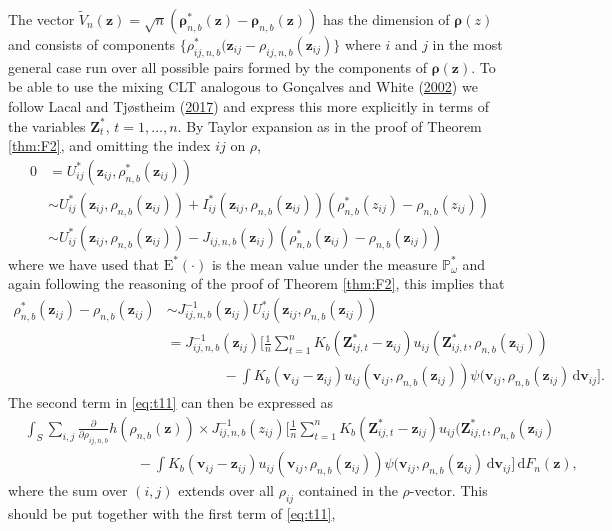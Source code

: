 \documentclass[
  12pt,
  letterpaper]{article}
\numberwithin{equation}{section}
\newcommand{\Z}{\bm{Z}}
\newcommand{\z}{\bm{z}}
\newcommand{\fv}{\bm{v}}
\newcommand{\frho}{\bm{\rho}}
\newcommand{\E}{\textrm{E}}
\newcommand{\di}{\,\textrm{d}}
\begin{document}
The vector \(\tilde{V}_n(\z) = \sqrt{n}\left(\frho_{n,b}^*(\z)-\frho_{n,b}(\z)\right)\) has the dimension of \(\frho(z)\) and consists of components \(\{\rho_{ij,n,b}^*(\z_{ij}-\rho_{ij,n,b}(\z_{ij})\}\) where \(i\) and \(j\) in the most general case run over all possible pairs formed by the components of \(\frho(\z)\). To be able to use the mixing CLT analogous to Gonçalves and White (\protect\hyperlink{ref-gonccalves2002bootstrap}{2002}) we follow Lacal and Tjøstheim (\protect\hyperlink{ref-lacal2017local}{2017}) and express this more explicitly in terms of the variables \(\Z^{*}_t\), \(t=1,\ldots,n\). By Taylor expansion as in the proof of Theorem \ref{thm:F2}, and omitting the index \(ij\) on \(\rho\),
\begin{align*}
0 &= U_{ij}^*(\z_{ij},\rho_{n,b}^*(\z_{ij})) \\
& \sim U_{ij}^*(\z_{ij},\rho_{n,b}(\z_{ij}))+I_{ij}^*(\z_{ij},\rho_{n,b}(\z_{ij}))(\rho_{n,b}^*(z_{ij})-\rho_{n,b}(z_{ij})) \\
& \sim U_{ij}^*(\z_{ij},\rho_{n,b}(\z_{ij})) - J_{ij,n,b}(\z_{ij})(\rho_{n,b}^*(\z_{ij})-\rho_{n,b}(\z_{ij}))
\end{align*}
where we have used that \(\E^*(\cdot)\) is the mean value under the measure \(\mathbb{P}_{\omega}^{*}\) and again following the reasoning of the proof of Theorem \ref{thm:F2}, this
implies that
\begin{align}
\rho_{n,b}^*(\z_{ij}) - \rho_{n,b}(\z_{ij}) &\sim J_{ij,n,b}^{-1}(\z_{ij})U^*_{ij}(\z_{ij},\rho_{n,b}(\z_{ij})) \nonumber \\
& = J_{ij,n,b}^{-1}(\z_{ij})\Big[\frac{1}{n}\sum_{t=1}^{n} K_b(\Z_{ij,t}^{*} - \z_{ij})u_{ij}(\Z_{ij,t}^{*},\rho_{n,b}(\z_{ij})) \nonumber \\
 & \qquad\qquad - \int K_b(\fv_{ij} - \z_{ij})u_{ij}(\fv_{ij},\rho_{n,b}(\z_{ij}))\psi(\fv_{ij},\rho_{n,b}(\z_{ij}) \di \fv_{ij}\big].
\end{align}
The second term in \eqref{eq:t11} can then be expressed as
\begin{align}
&\int_S \sum_{i,j} \frac{\partial}{\partial \rho_{ij,n,b}} h(\rho_{n,b}(\z)) \times
 J_{ij,n,b}^{-1}(z_{ij})
\Big[\frac{1}{n}\sum_{t=1}^{n} K_b(\Z_{ij,t}^{*}-\z_{ij})u_{ij}(\Z_{ij,t}^{*},\rho_{n,b}(\z_{ij})  \nonumber \\
& \qquad\qquad\qquad\qquad - \int K_b(\fv_{ij} - \z_{ij})u_{ij}(\fv_{ij},\rho_{n,b}(\z_{ij}))\psi(\fv_{ij},\rho_{n,b}(\z_{ij}) \di \fv_{ij}\Big] \di F_n(\z),
\label{eq:t22}
\end{align}
where the sum over \((i,j)\) extends over all \(\rho_{ij}\) contained in the \(\rho\)-vector. This should be put together with the first term of \eqref{eq:t11},
\end{document}
